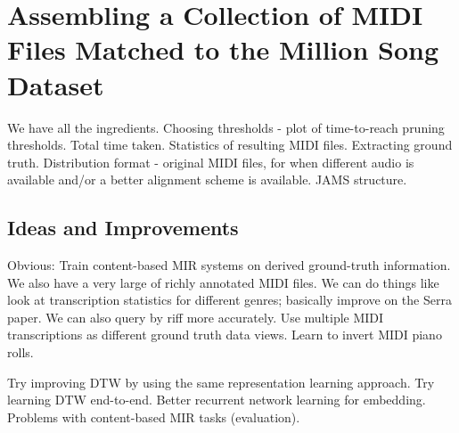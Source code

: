 \chapter{Assembling a Collection of MIDI Files Matched to the Million Song Dataset}

We have all the ingredients.
Choosing thresholds - plot of time-to-reach pruning thresholds.
Total time taken.
Statistics of resulting MIDI files.
Extracting ground truth.
Distribution format - original MIDI files, for when different audio is available and/or a better alignment scheme is available.
JAMS structure.

\section{Ideas and Improvements}

Obvious: Train content-based MIR systems on derived ground-truth information.
We also have a very large of richly annotated MIDI files.
We can do things like look at transcription statistics for different genres; basically improve on the Serra paper.
We can also query by riff more accurately.
Use multiple MIDI transcriptions as different ground truth data views.
Learn to invert MIDI piano rolls.

Try improving DTW by using the same representation learning approach.
Try learning DTW end-to-end.
Better recurrent network learning for embedding.
Problems with content-based MIR tasks (evaluation).

